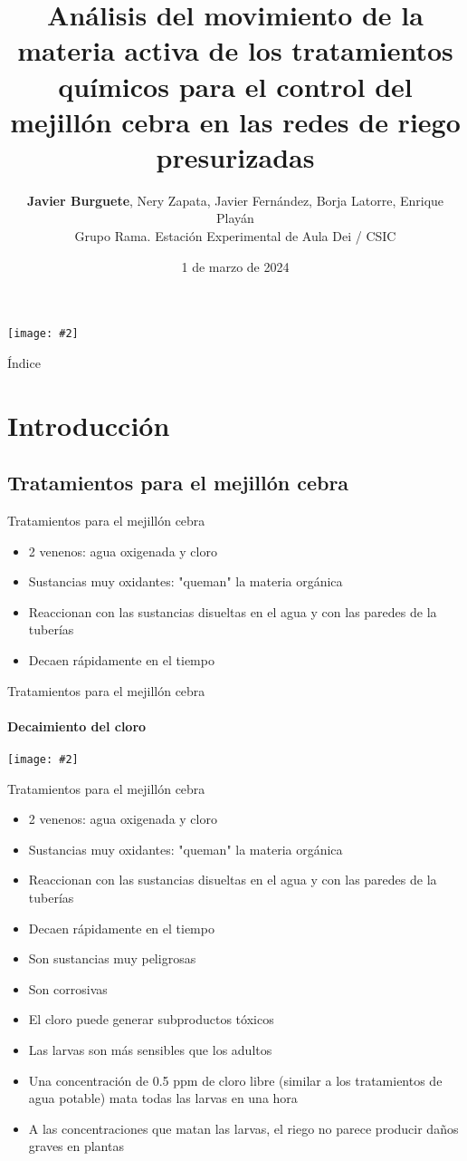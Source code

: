 \documentclass[pdr]{beamer}
\title[Análisis de los tratamientos químicos para el control del mejillón cebra
	en redes de riego presurizadas]
{Análisis del movimiento de la materia activa de los tratamientos químicos para
el control del mejillón cebra en las redes de riego presurizadas}
\author[{\bfseries Javier Burguete}\\Grupo Rama, EEAD / CSIC]
{{\bfseries Javier Burguete}, Nery Zapata, Javier Fernández, Borja Latorre,
	Enrique Playán\\
	Grupo Rama. Estación Experimental de Aula Dei / CSIC}
\date{1 de marzo de 2024}
\newcommand{\FIGURE}[2]
{
	\begin{center}
		\texttt{[image: \#2]}
	\end{center}
}
\begin{document}
\begin{frame}
	\begin{titlepage}
		\centering
		\FIGURE{0.9\textwidth}{Logos.pdf}
	\end{titlepage}
\end{frame}

\begin{frame}{Índice}
	\tableofcontents
\end{frame}

\section{Introducción}

\subsection{Tratamientos para el mejillón cebra}

\begin{frame}{Tratamientos para el mejillón cebra}
	\begin{itemize}
		\item 2 venenos: agua oxigenada y cloro
		\item Sustancias muy oxidantes: "queman" la materia orgánica
		\item Reaccionan con las sustancias disueltas en el agua y con
			las paredes de la tuberías
		\item Decaen rápidamente en el tiempo
	\end{itemize}
\end{frame}

\begin{frame}{Tratamientos para el mejillón cebra}
	\framesubtitle{Decaimiento del cloro}
	\FIGURE{\textwidth}{chlorine-decay.eps}
\end{frame}

\begin{frame}{Tratamientos para el mejillón cebra}
	\begin{itemize}
		\item 2 venenos: agua oxigenada y cloro
		\item Sustancias muy oxidantes: "queman" la materia orgánica
		\item Reaccionan con las sustancias disueltas en el agua y con
			las paredes de la tuberías
		\item Decaen rápidamente en el tiempo
		\item Son sustancias muy peligrosas
		\item Son corrosivas
		\item El cloro puede generar subproductos tóxicos
		\item Las larvas son más sensibles que los adultos
		\item Una concentración de 0.5 ppm de cloro libre (similar a los
			tratamientos de agua potable) mata todas las larvas en
			una hora
		\item A las concentraciones que matan las larvas, el riego no
			parece producir daños graves en plantas
	\end{itemize}
\end{frame}
\end{document}
